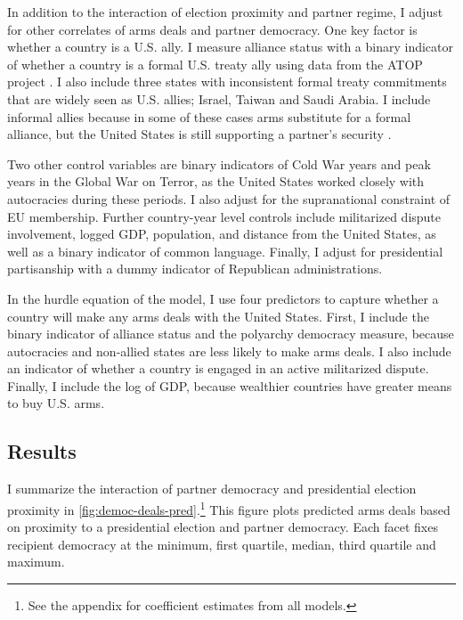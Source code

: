 \documentclass[12pt]{article}
\begin{document}
In addition to the interaction of election proximity and partner regime, I adjust for other correlates of arms deals and partner democracy. 
One key factor is whether a country is a U.S. ally. 
I measure alliance status with a binary indicator of whether a country is a formal U.S. treaty ally using data from the ATOP project \citep{Leedsetal2002}.
I also include three states with inconsistent formal treaty commitments that are widely seen as U.S. allies; Israel, Taiwan and Saudi Arabia. 
I include informal allies because in some of these cases arms substitute for a formal alliance, but the United States is still supporting a partner's security \citep{Yarhi-Miloetal2016}. 


Two other control variables are binary indicators of Cold War years and peak years in the Global War on Terror, as the United States worked closely with autocracies during these periods. 
I also adjust for the supranational constraint of EU membership. 
Further country-year level controls include militarized dispute involvement, logged GDP, population, and distance from the United States, as well as a binary indicator of common language. 
Finally, I adjust for presidential partisanship with a dummy indicator of Republican administrations.  


In the hurdle equation of the model, I use four predictors to capture whether a country will make any arms deals with the United States. 
First, I include the binary indicator of alliance status and the polyarchy democracy measure, because autocracies and non-allied states are less likely to make arms deals. 
I also include an indicator of whether a country is engaged in an active militarized dispute. 
Finally, I include the log of GDP, because wealthier countries have greater means to buy U.S. arms.


\subsection{Results}


I summarize the interaction of partner democracy and presidential election proximity in \autoref{fig:democ-deals-pred}.\footnote{See the appendix for coefficient estimates from all models.}
This figure plots predicted arms deals based on proximity to a presidential election and partner democracy.
Each facet fixes recipient democracy at the minimum, first quartile, median, third quartile and maximum.
\end{document}
